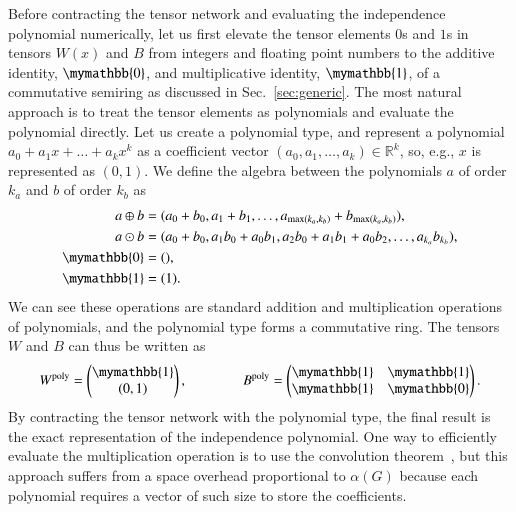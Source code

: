 \documentclass[onefignum, onetabnum]{siamart190516}
\newcommand{\<}{\langle}
\renewcommand{\>}{\rangle}
\begin{document}
Before contracting the tensor network and evaluating the independence polynomial numerically, let us first elevate the tensor elements $0$s and $1$s in tensors $W(x)$ and $B$ from integers and floating point numbers to the additive identity,
$\mymathbb{0}$, and multiplicative identity, $\mymathbb{1}$, of a commutative semiring as discussed in Sec.~\ref{sec:generic}.
The most natural approach is to treat the tensor elements as polynomials and evaluate the polynomial directly.
Let us create a polynomial type, and represent a polynomial $a_0 + a_1 x + \ldots + a_k x^k$ as a coefficient vector $(a_0, a_1, \ldots, a_k) \in \mathbb{R}^k$, so, e.g., $x$ is represented as $(0, 1)$.
We define the algebra between the polynomials $a$ of order $k_a$ and $b$ of order $k_b$ as
\begin{equation}
    \begin{split}
    a \oplus b &= (a_0 + b_0, a_1 + b_1, \ldots, a_{\max(k_a, k_b)} + b_{\max(k_a, k_b)}),\\
    a \odot b &= (a_0 + b_0, a_1b_0 + a_0b_1, a_{2}b_{0} + a_{1}b_{1} + a_{0}b_{2},  \ldots, a_{k_a} b_{k_b}),\\
    \mymathbb{0} &= (),  \\
    \mymathbb{1} &= (1).\label{eq:polynomial}
    \end{split}
\end{equation}
We can see these operations are standard addition and multiplication operations of polynomials, and the polynomial type forms a commutative ring. The tensors $W$ and $B$ can thus be written as 
\begin{equation}
    W^{\rm poly} = \left(\begin{matrix}
        \mymathbb{1} \\
        (0,1)
    \end{matrix}\right),   
    \qquad \qquad
        B^{\rm poly} = \left(\begin{matrix}
        \mymathbb{1}  & \mymathbb{1} \\
        \mymathbb{1} & \mymathbb{0}
    \end{matrix}\right).
\end{equation}
By contracting the tensor network with the polynomial type, the final result is the exact representation of the independence polynomial.
One way to efficiently evaluate the multiplication operation is to use the convolution theorem~\cite{Schonhage1971}, but this approach suffers from a space overhead proportional to $\alpha(G)$ because each polynomial requires a vector of such size to store the coefficients. 
\end{document}
